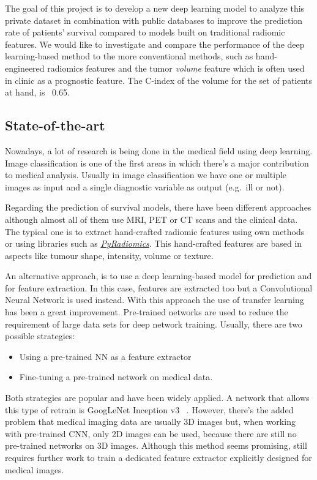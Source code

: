 The goal of this project is to develop a new deep learning model to analyze this private 
dataset in combination with public databases to improve the prediction rate of patients' 
survival compared to models built on traditional radiomic features. We would like to 
investigate and compare the performance of the deep learning-based method 
to the more conventional methods, such as hand-engineered radiomics features and the tumor 
\emph{volume} feature which is often used in clinic as a prognostic feature. The C-index 
of the volume for the set of patients at hand, is ~0.65.

\subsection{State-of-the-art}

Nowadays, a lot of research is being done in the medical field using deep learning. Image
classification is one of the first areas in which there's a major contribution to medical analysis.
Usually in image classification we have one or multiple images as input and a single diagnostic 
variable as output (e.g.~ill or not).
~\cite{medical:survey-deep-learning}

Regarding the prediction of survival models, there have been different approaches although
almost all of them use MRI, PET or CT scans and the clinical data. The typical one is to extract
hand-crafted radiomic features using own methods or using libraries such as
\href{https://github.com/Radiomics/pyradiomics}{\emph{PyRadiomics}}. This hand-crafted 
features are based in aspects like tumour shape, intensity, volume or texture.
~\cites{medical:tumour-radiomics}{medical:py-radiomics}

An alternative approach, is to use a deep learning-based model for prediction and for feature
extraction. In this case, features are extracted too but a Convolutional
Neural Network is used instead. With this approach the use of transfer learning has been a
great improvement. Pre-trained networks are used to reduce the requirement of large data
sets for deep network training. Usually, there are two possible strategies: 
\begin{itemize}[noitemsep, topsep=0pt]
  \item Using a pre-trained NN as a feature extractor
  \item Fine-tuning a pre-trained network on medical data.
\end{itemize}

Both strategies are popular and have been widely applied. A network that allows this type
of retrain is GoogLeNet Inception v3
~\cites{neural:goog-le-net}{neural:retrain}{neural:inception-retrain}.
However, there's the added problem that medical imaging data are usually 3D images but, 
when working with pre-trained CNN, only 2D images can be used, because there are still no 
pre-trained networks on 3D images. Although this method seems promising, still requires 
further work to train a dedicated feature extractor explicitly designed for medical images.
~\cite{medical:deep-learning-radiomics-gbm}

